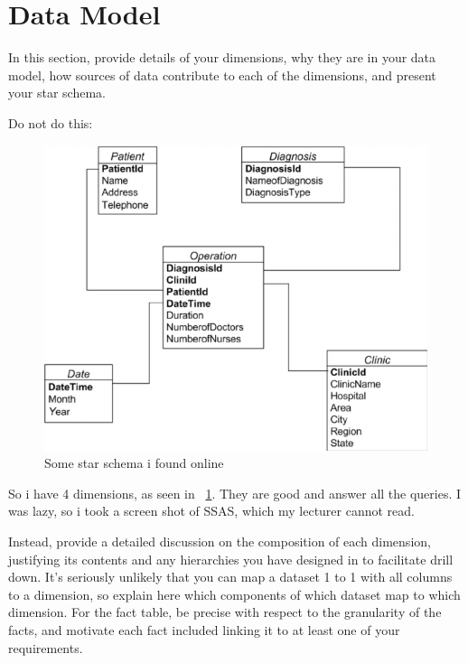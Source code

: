 \section{Data Model}
\label{sec:dataModel}

In this section, provide details of your dimensions, why they are in your data model, how sources of data contribute to each of the dimensions, and present your star schema. 

Do not do this:

\begin{figure}[ht]
\centering
\includegraphics[width=.6\textwidth]{figures/sampleStar.png}
\caption{Some star schema i found online}
\label{fig:star}
\end{figure}

So i have 4 dimensions, as seen in \figurename~\ref{fig:star}. They are good and answer all the queries. I was lazy, so i took a screen shot of SSAS, which my lecturer cannot read.

Instead, provide a detailed discussion on the composition of each dimension, justifying its contents and any hierarchies you have designed in to facilitate drill down. It's seriously unlikely that you can map a dataset 1 to 1 with all columns to a dimension, so explain here which components of which dataset map to which dimension. For the fact table, be precise with respect to the granularity of the facts, and motivate each fact included linking it to at least one of your requirements.
